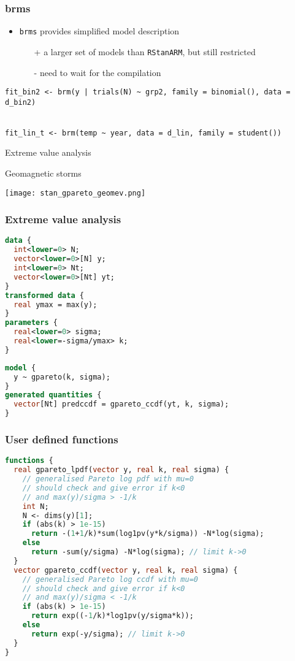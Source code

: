 \documentclass[finnish,english,t]{beamer}
\begin{document}
\begin{frame}[fragile]
  \frametitle{brms}

  \begin{itemize}
  \item \texttt{brms} provides simplified model description
    \begin{itemize}
    \item[+] a larger set of models than \texttt{RStanARM}, but still restricted
    \item[-] need to wait for the compilation
    \end{itemize}
  \end{itemize}

  {\scriptsize
\begin{lstlisting}[]
fit_bin2 <- brm(y | trials(N) ~ grp2, family = binomial(), data = d_bin2)


fit_lin_t <- brm(temp ~ year, data = d_lin, family = student())
\end{lstlisting}
  }
    
\end{frame} 

\begin{frame}{Extreme value analysis}

Geomagnetic storms

\texttt{[image: stan\_gpareto\_geomev.png]}  

\end{frame}

\begin{frame}[fragile]
  \frametitle{Extreme value analysis}
  {\footnotesize
    \color{gray}
  \begin{lstlisting}[language=Stan]
data {
  int<lower=0> N;
  vector<lower=0>[N] y;
  int<lower=0> Nt;
  vector<lower=0>[Nt] yt;
}
transformed data {
  real ymax = max(y);
}
parameters {
  real<lower=0> sigma; 
  real<lower=-sigma/ymax> k; 
}
\end{lstlisting}
    \color{black}
  \begin{lstlisting}[language=Stan]
model {
  y ~ gpareto(k, sigma);
}
generated quantities {
  vector[Nt] predccdf = gpareto_ccdf(yt, k, sigma);
}
  \end{lstlisting}
}
\end{frame} 

\begin{frame}[fragile]
  \frametitle{User defined functions}
  {\footnotesize
  \begin{lstlisting}[language=Stan]
functions {
  real gpareto_lpdf(vector y, real k, real sigma) {
    // generalised Pareto log pdf with mu=0
    // should check and give error if k<0 
    // and max(y)/sigma > -1/k
    int N;
    N <- dims(y)[1];
    if (abs(k) > 1e-15)
      return -(1+1/k)*sum(log1pv(y*k/sigma)) -N*log(sigma);
    else
      return -sum(y/sigma) -N*log(sigma); // limit k->0
  }
  vector gpareto_ccdf(vector y, real k, real sigma) {
    // generalised Pareto log ccdf with mu=0
    // should check and give error if k<0 
    // and max(y)/sigma < -1/k
    if (abs(k) > 1e-15)
      return exp((-1/k)*log1pv(y/sigma*k));
    else
      return exp(-y/sigma); // limit k->0
  }
}
  \end{lstlisting}
}
\end{frame} 
\end{document}
